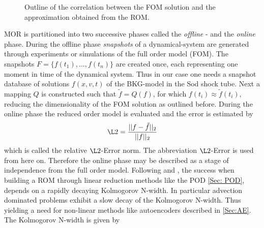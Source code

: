 \begin{figure}[H]
	\begin{subfigure}{.45\textwidth}
		\centering
		
	\end{subfigure}\hfill
	\begin{subfigure}{.45\textwidth}
		\centering
		
	\end{subfigure}
	\caption{Outline of the correlation between the FOM solution and the approximation obtained from the ROM.}
\end{figure}
MOR is partitioned into two successive phases called the \textit{offline} - and the \textit{online} phase. During the offline phase \textit{snapshots} of a dynamical-system are generated through experiments or simulations of the full order model (FOM). The snapshots \(F = \{f(t_1),...,f(t_n)\}\) are created once, each representing one moment in time of the dynamical system. Thus in our case one needs a snapshot database of solutions \(f(x,v,t)\) of the BKG-model in the Sod shock tube. Next a mapping \(Q\) is constructed such that \(\tilde{f} = Q(f)\), for which \(f(t_i) \approx \tilde{f}(t_i)\), reducing the dimensionality of the FOM solution as outlined before. During the online phase the reduced order model is evaluated and the error is estimated by 
\begin{equation}
	\L2 = \frac{||f - \tilde{f} ||_2}{||f||_2}
\end{equation}
which is called the relative \(\L2\)-Error norm. The abbreviation \(\L2\)-Error is used from here on. Therefore the online phase may be described as a stage of independence from the full order model.
Following \cite{ohlberger2015reduced} and \cite{Carlberg}, the success when building a ROM through linear reduction methods like the POD \cref{Sec: POD}, depends on a rapidly decaying Kolmogorov N-width. In particular advection dominated problems exhibit a slow decay of the Kolmogorov N-width. Thus yielding a need for non-linear methods like autoencoders described in \cref{Sec:AE}. The Kolmogorov N-width is given by

